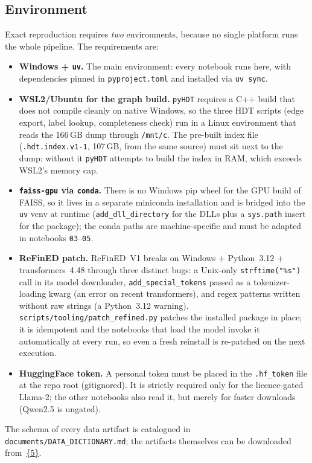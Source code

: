 \documentclass{article}
\begin{document}
\subsection*{Environment}
Exact reproduction requires \emph{two} environments, because no single platform runs the whole pipeline. The requirements are:
\begin{itemize}\itemsep 0pt \parskip 0pt
\item \textbf{Windows + \texttt{uv}.} The main environment: every notebook runs here, with dependencies pinned in \texttt{pyproject.toml} and installed via \texttt{uv sync}.
\item \textbf{WSL2/Ubuntu for the graph build.} \texttt{pyHDT} requires a C++ build that does not compile cleanly on native Windows, so the three HDT scripts (edge export, label lookup, completeness check) run in a Linux environment that reads the 166\,GB dump through \texttt{/mnt/c}. The pre-built index file (\texttt{.hdt.index.v1-1}, 107\,GB, from the same source) must sit next to the dump: without it \texttt{pyHDT} attempts to build the index in RAM, which exceeds WSL2's memory cap.
\item \textbf{\texttt{faiss-gpu} via \texttt{conda}.} There is no Windows pip wheel for the GPU build of FAISS, so it lives in a separate miniconda installation and is bridged into the \texttt{uv} venv at runtime (\texttt{add\_dll\_directory} for the DLLs plus a \texttt{sys.path} insert for the package); the conda paths are machine-specific and must be adapted in notebooks \texttt{03}--\texttt{05}.
\item \textbf{ReFinED patch.} ReFinED~V1 breaks on Windows + Python~3.12 + transformers~4.48 through three distinct bugs: a Unix-only \texttt{strftime("\%s")} call in its model downloader, \texttt{add\_special\_tokens} passed as a tokenizer-loading kwarg (an error on recent transformers), and regex patterns written without raw strings (a Python~3.12 warning). \texttt{scripts/tooling/patch\_refined.py} patches the installed package in place; it is idempotent and the notebooks that load the model invoke it automatically at every run, so even a fresh reinstall is re-patched on the next execution.
\item \textbf{HuggingFace token.} A personal token must be placed in the \texttt{.hf\_token} file at the repo root (gitignored). It is strictly required only for the licence-gated Llama-2; the other notebooks also read it, but merely for faster downloads (Qwen2.5 is ungated).
\end{itemize}
The schema of every data artifact is catalogued in \texttt{documents/DATA\_DICTIONARY.md}; the artifacts themselves can be downloaded from~\href{https://drive.google.com/drive/folders/1RlQuowaWmVF0fe2fcAqVBBaT4dmsnU7s}{\{5\}}.
\end{document}
